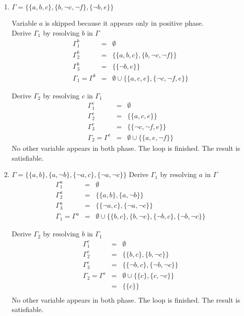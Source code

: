 \documentclass[11pt]{homework}
\begin{document}
\begin{enumerate}
  \item
  \(\Gamma = \{ \{a,b,c\}, \{b,\neg c,\neg f\}, \{\neg b, e\} \}\)

  Variable \(a\) is skipped because it appears only in positive phase. \\
  Derive \(\Gamma_1\) by resolving \(b\) in \(\Gamma\)
\[
  \begin{array}{rcl}
    \Gamma_1^b &=& \emptyset \\
    \Gamma_2^b &=& \{\{a,b,c\}, \{b,\neg c,\neg f\}\} \\
    \Gamma_3^b &=& \{\{\neg b, e\}\} \\
      
    \Gamma_1 = \Gamma^b &=& 
      \emptyset \cup \{\{a,c,e\}, \{\neg c,\neg f, e\}\}
  \end{array}
\]

  Derive \(\Gamma_2\) by resolving \(c\) in \(\Gamma_1\)
  \[
  \begin{array}{rcl}
  \Gamma_1^c &=& \emptyset \\
  \Gamma_2^c &=& \{\{a,c,e\}\} \\
  \Gamma_3^c &=& \{\{\neg c, \neg f, e\}\} \\

  \Gamma_2 = \Gamma^c &=& 
    \emptyset \cup \{\{a,e,\neg f\}\}
  \end{array}
  \]
  No other variable appears in both phase. The loop is finished.
  The result is satisfiable.


  \item
  \(\Gamma = \{ \{a,b\}, \{a,\neg b\}, \{\neg a, c\}, \{\neg a,\neg c\} \}\)
    Derive \(\Gamma_1\) by resolving \(a\) in \(\Gamma\)
    \[
    \begin{array}{rcl}
    \Gamma_1^a &=& \emptyset \\
    \Gamma_2^a &=& \{\{a,b\}, \{a,\neg b\}\} \\
    \Gamma_3^a &=& \{\{\neg a, c\}, \{\neg a,\neg c\}\} \\
    
    \Gamma_1 = \Gamma^a &=& 
    \emptyset \cup \{\{b,c\}, \{b, \neg c\}, \{\neg b, c\}, \{\neg b,\neg c\}\}
    \end{array}
    \]
    
    Derive \(\Gamma_2\) by resolving \(b\) in \(\Gamma_1\)
    \[
    \begin{array}{rcl}
    \Gamma_1^c &=& \emptyset \\
    \Gamma_2^c &=& \{\{b,c\}, \{b, \neg c\}\} \\
    \Gamma_3^c &=& \{\{\neg b, c\}, \{\neg b,\neg c\}\} \\
    
    \Gamma_2 = \Gamma^c &=& 
      \emptyset \cup \{\{c\}, \{c, \neg c\}\} \\
               &=& \{\{c\}\} \\
    \end{array}
    \]
    No other variable appears in both phase. The loop is finished.
    The result is satisfiable.

\end{enumerate}
\end{document}
